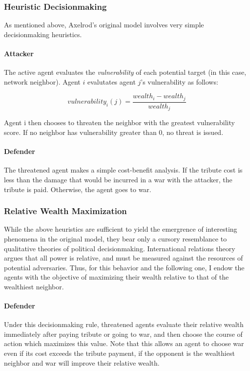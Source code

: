 \documentclass{article}
\begin{document}
\subsubsection{Heuristic Decisionmaking}

As mentioned above, Axelrod's original model involves very simple decisionmaking heuristics.

\paragraph{Attacker}
The active agent evaluates the \emph{vulnerability} of each potential target (in this case, network neighbor). Agent $i$ evalutates agent $j$'s vulnerability as follows:

\[
vulnerability_{i}(j)=\frac{wealth_i - wealth_j}{wealth_j}
\]

Agent i then chooses to threaten the neighbor with the greatest vulnerability score. If no neighbor has vulnerability greater than 0, no threat is issued.

\paragraph{Defender}
The threatened agent makes a simple cost-benefit analysis. If the tribute cost is less than the damage that would be incurred in a war with the attacker, the tribute is paid. Otherwise, the agent goes to war. 

\subsubsection{Relative Wealth Maximization}

While the above heuristics are sufficient to yield the emergrence of interesting phenomena in the original model, they bear only a cursory resemblance to qualitative theories of political decisionmaking. International relations theory argues that all power is relative, and must be measured against the resources of potential adversaries. Thus, for this behavior and the following one, I endow the agents with the objective of maximizing their wealth relative to that of the wealthiest neighbor. 

\paragraph{Defender}
Under this decisionmaking rule, threatened agents evaluate their relative wealth immediately after paying tribute or going to war, and then choose the course of action which maximizes this value. Note that this allows an agent to choose war even if its cost exceeds the tribute payment, if the opponent is the wealthiest neighbor and war will improve their relative wealth.
\end{document}
